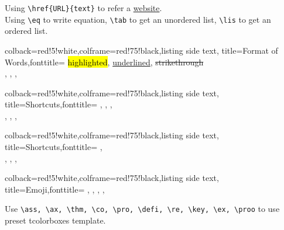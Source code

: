 \documentclass[12pt]{report}
\begin{document}
\no Using \verb=\href{URL}{text}= to refer a \href{EurekaTangChen.github.io}{website}.\\
\no Using \verb=\eq= to write equation, \verb=\tab= to get an unordered list,
\verb=\lis= to get an ordered list.\\
 \label{eq:Example}


\begin{tcblisting}{colback=red!5!white,colframe=red!75!black,listing side text,
        title=Format of Words,fonttitle=\bfseries}
    \hl{highlighted}, \ul{underlined}, \st{strikethrough}\\
    , , , 
\end{tcblisting}
\begin{tcblisting}{colback=red!5!white,colframe=red!75!black,listing side text,
        title=Shortcuts,fonttitle=\bfseries}
    \RR, \NN, \ZZ, \QQ\\
    \bA, \bB, \bC, \bD
\end{tcblisting}
\begin{tcblisting}{colback=red!5!white,colframe=red!75!black,listing side text,
        title=Shortcuts,fonttitle=\bfseries}
    , \\
    \cA, \cB, \cC, \cD
\end{tcblisting}
\begin{tcblisting}{colback=red!5!white,colframe=red!75!black,listing side text,
        title=Emoji,fonttitle=\bfseries}
    \emogood, \emobad, \emocool, \emoheart, \emotree
\end{tcblisting}

\no Use \verb=\ass, \ax, \thm, \co, \pro, \defi, \re, \key, \ex, \proo= to
\no use preset tcolorboxes template.
 \label{ax:Example}
 \label{pro:Example}
\end{document}
